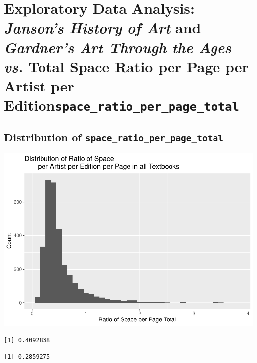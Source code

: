 \documentclass[
  letterpaper,
  DIV=11,
  numbers=noendperiod]{scrreprt}
\begin{document}
\hypertarget{exploratory-data-analysis-jansons-history-of-art-and-gardners-art-through-the-ages-vs.-total-space-ratio-per-page-per-artist-per-editionspace_ratio_per_page_total}{%
\chapter{\texorpdfstring{Exploratory Data Analysis: \emph{Janson's
History of Art} and \emph{Gardner's Art Through the Ages vs.} Total
Space Ratio per Page per Artist per
Edition\texttt{space\_ratio\_per\_page\_total}}{Exploratory Data Analysis: Janson's History of Art and Gardner's Art Through the Ages vs. Total Space Ratio per Page per Artist per Editionspace\_ratio\_per\_page\_total}}\label{exploratory-data-analysis-jansons-history-of-art-and-gardners-art-through-the-ages-vs.-total-space-ratio-per-page-per-artist-per-editionspace_ratio_per_page_total}}

\hypertarget{distribution-of-space_ratio_per_page_total}{%
\section{\texorpdfstring{Distribution of
\texttt{space\_ratio\_per\_page\_total}}{Distribution of space\_ratio\_per\_page\_total}}\label{distribution-of-space_ratio_per_page_total}}

\includegraphics{Chapter1/Chapter1_files/figure-pdf/spaceratioperpagetotal-1.pdf}

\begin{verbatim}
[1] 0.4092838
\end{verbatim}

\begin{verbatim}
[1] 0.2859275
\end{verbatim}
\end{document}
